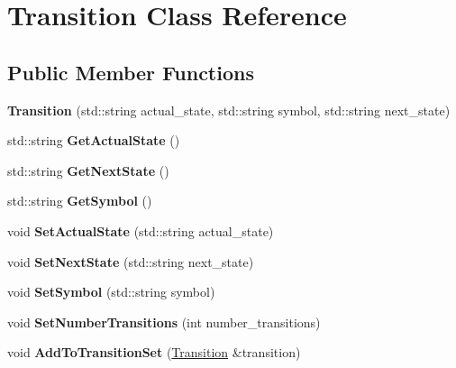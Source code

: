 \hypertarget{classTransition}{}\section{Transition Class Reference}
\label{classTransition}
\subsection*{Public Member Functions}
\begin{DoxyCompactItemize}
\item 
\mbox{\label{classTransition_ace14152c505810535ce6c2166a92582f}} 
{\bfseries Transition} (std\+::string actual\+\_\+state, std\+::string symbol, std\+::string next\+\_\+state)
\item 
\mbox{\label{classTransition_af562921b1f4c018dbd23175f068177dd}} 
std\+::string {\bfseries Get\+Actual\+State} ()
\item 
\mbox{\label{classTransition_a3ffdd67d98d0c6158c73b691f10e4392}} 
std\+::string {\bfseries Get\+Next\+State} ()
\item 
\mbox{\label{classTransition_a21056331ad32e3f32370127c6cf4be24}} 
std\+::string {\bfseries Get\+Symbol} ()
\item 
\mbox{\label{classTransition_a7885360c211f7f35ff72f9a3b868aa35}} 
void {\bfseries Set\+Actual\+State} (std\+::string actual\+\_\+state)
\item 
\mbox{\label{classTransition_ae5d10fa5a007a2315b5ded4515ff88f0}} 
void {\bfseries Set\+Next\+State} (std\+::string next\+\_\+state)
\item 
\mbox{\label{classTransition_a0040651c4cc7205f51158d2c5c8bab16}} 
void {\bfseries Set\+Symbol} (std\+::string symbol)
\item 
\mbox{\label{classTransition_ab7bee49e1cdf54cf7dd5f82c3fbeb93f}} 
void {\bfseries Set\+Number\+Transitions} (int number\+\_\+transitions)
\item 
\mbox{\label{classTransition_a03732624209bd0e25ee8dd57f113304c}} 
void {\bfseries Add\+To\+Transition\+Set} (\hyperlink{classTransition}{Transition} \&transition)
\end{DoxyCompactItemize}
